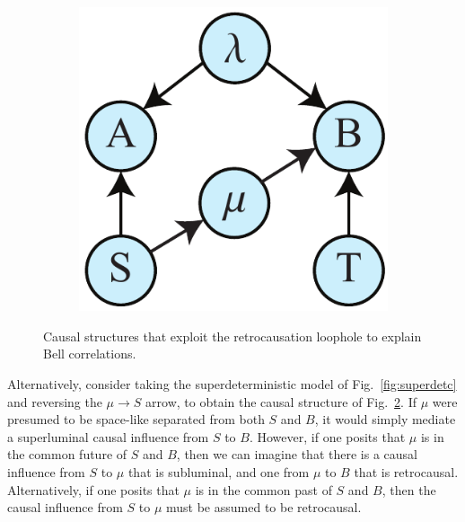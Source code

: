 \documentclass[letterpaper,onecolumn,nofootinbib]{revtex4}
\begin{document}
\begin{figure}[h]
\begin{subfigure}[b]{0.18\textwidth}
             	\subcaption{}
                	\label{fig:retrob}
        \end{subfigure}
        \hspace{5em}
        \begin{subfigure}[b]{0.18\textwidth}
                	\centering
        		\includegraphics[width=\textwidth]{bell-SB-ret-1}
             	\subcaption{}
                	\label{fig:retroc}
        \end{subfigure}
 \caption{Causal structures that exploit the retrocausation loophole to explain Bell correlations.}
 \label{fig:retro}
\end{figure}


Alternatively, consider taking the superdeterministic model of Fig.~\ref{fig:superdetc} and reversing the $\mu \to S$ arrow, to obtain the causal structure of Fig.~\ref{fig:retroc}.  If $\mu$ were presumed to be space-like separated from both $S$ and $B$, it would simply mediate a superluminal causal influence from $S$ to $B$.  However, if one posits that $\mu$ is in the common future of $S$ and $B$, then we can imagine that there is a causal influence from $S$ to $\mu$ that is subluminal, and one from $\mu$ to $B$ that is retrocausal.  Alternatively, if one posits that $\mu$ is in the common past of $S$ and $B$, then the causal influence from $S$ to $\mu$ must be assumed to be retrocausal.
\end{document}
